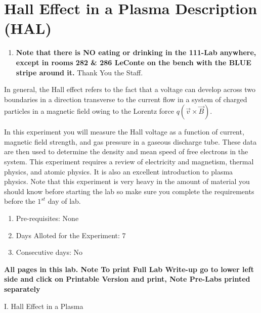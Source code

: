 \documentclass{../lab}
\begin{document}
\maketitle

\tableofcontents

\section{Hall Effect in a Plasma Description (HAL)}

\begin{enumerate}
    \item \textbf{Note that there is NO eating or drinking in the 111-Lab anywhere, except in rooms 282 \& 286 LeConte on the bench with the BLUE stripe around it.} Thank You the Staff.
\end{enumerate}

In general, the Hall effect refers to the fact that a voltage can develop across two boundaries in a direction transverse to the current flow in a system of charged particles in a magnetic field owing to the Lorentz force $q (\vec{v} \times \vec{B})$.

In this experiment you will measure the Hall voltage as a function of current, magnetic field strength, and gas pressure in a gaseous discharge tube. These data are then used to determine the density and mean speed of free electrons in the system. This experiment requires a review of electricity and magnetism, thermal physics, and atomic physics. It is also an excellent introduction to plasma physics. Note that this experiment is very heavy in the amount of material you should know before starting the lab so make sure you complete the requirements before the $1^{st}$ day of lab.

\begin{enumerate}
    \item Pre-requisites: None

    \item Days Alloted for the Experiment: 7

    \item Consecutive days: No

\end{enumerate}

\textbf{All pages in this lab. Note To print Full Lab Write-up go to lower left side and click on Printable Version and print, Note Pre-Labs printed separately }

I. Hall Effect in a Plasma
\end{document}
